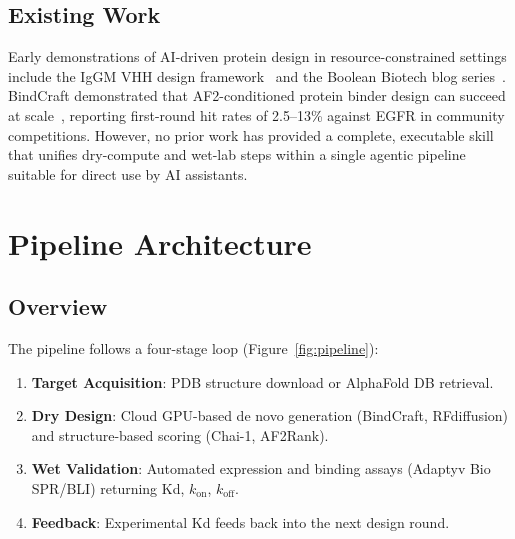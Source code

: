\documentclass[12pt,a4paper]{article}
\begin{document}
\subsection{Existing Work}

Early demonstrations of AI-driven protein design in resource-constrained
settings include the IgGM VHH design framework~\citep{iggm} and the Boolean
Biotech blog series~\citep{boolean_blog}. BindCraft demonstrated that
AF2-conditioned protein binder design can succeed at scale~\citep{bindcraft},
reporting first-round hit rates of 2.5--13\% against EGFR in community
competitions. However, no prior work has provided a complete, executable
skill that unifies dry-compute and wet-lab steps within a single agentic
pipeline suitable for direct use by AI assistants.

\section{Pipeline Architecture}

\subsection{Overview}

The pipeline follows a four-stage loop (Figure~\ref{fig:pipeline}):

\begin{enumerate}
  \item \textbf{Target Acquisition}: PDB structure download or AlphaFold DB
    retrieval.
  \item \textbf{Dry Design}: Cloud GPU-based de novo generation (BindCraft,
    RFdiffusion) and structure-based scoring (Chai-1, AF2Rank).
  \item \textbf{Wet Validation}: Automated expression and binding assays
    (Adaptyv Bio SPR/BLI) returning Kd, $k_{\text{on}}$, $k_{\text{off}}$.
  \item \textbf{Feedback}: Experimental Kd feeds back into the next design
    round.
\end{enumerate}
\end{document}
